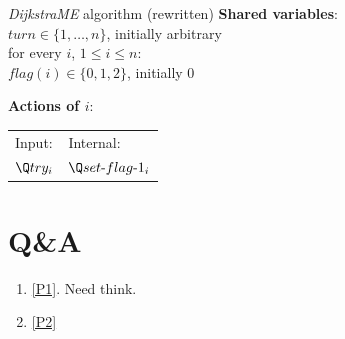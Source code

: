 \documentclass[11pt]{article}
\begin{document}
\begin{Block}{\textit{DijkstraME} algorithm (rewritten)}
\textbf{Shared variables}:\\
\(turn\in\{1,\dots,n\}\), initially arbitrary\\
for every \(i\), \(1\le i\le n\):\\
\indent\(flag(i)\in\{0,1,2\}\), initially 0

\noindent \textbf{Actions of \(i\)}:\\
\begin{tabular}{ll}
Input:\hspace{3cm} & Internal:\\
\(\Q try_i\) & \(\Q set\text{-}flag\text{-}1_i\)\\
\end{tabular}
\end{Block}
\section{Q\&A}
\label{sec:org08db701}
\begin{enumerate}
\item \ref{P1}. Need think.
\item \ref{P2}
\end{enumerate}
\end{document}
